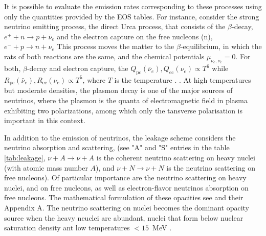 %
%
It is possible to evaluate the emission rates corresponding to these processes 
using only the quantities provided by the \ac{EOS} tables.
%
For instance, consider the strong neutrino emitting process, the direct Urca process, that consists of the $\beta$-decay, $e^+ + n \rightarrow p + \bar{\nu}_e$ and the electron capture on the free nucleons (n), $e^{-} + p \rightarrow n + \nu_e$ 
This process moves the matter to the $\beta$-equilibrium, in which the rats of both reactions are the same, 
and the chemical potentials $\mu_{\nu_e,\bar{\nu}_e}=0$.
%
For both, $\beta$-decay and electron capture, the 
$Q_{\text{pc}}(\bar{\nu}_e),Q_{\text{ec}}({\nu_e}) \propto T^{6}$ 
while 
$R_{\text{pc}}(\bar{\nu}_e),R_{\text{ec}}(\nu_e)\propto T^5$, 
where $T$ is the temperature \citep{Bruenn:1985}.
%
.
%
At high temperatures but moderate densities, the plasmon decay is one of the major sources of neutrinos, 
where the plasmon is the quanta of electromagnetic field in plasma exhibiting two polarizations, 
among which only the tansverse polarisation is important in this context.

In addition to the emission of neutrinos, the leakage scheme considers the neutrino absorption and scattering, 
(see "A" and "S" entries in the table \ref{tab:leakage}, $\nu+A\rightarrow\nu+A$ is the coherent neutrino 
scattering on heavy nuclei (with atomic mass number $A$), and $\nu+N\rightarrow\nu+N$ 
is the neutrino scattering on free nucleons).
%
Of particular importance are the neutrino scattering on heavy nuclei, and on free nucleons, 
as well as electron-flavor neutrinos absorption on free nucleons. 
The mathematical formulation of these opacities see \citet{Galeazzi:2013mia} and their Appendix A.
%
The neutrino scattering on nuclei becomes the dominant opacity source when the heavy neuclei 
are abundant, nuclei that form below nuclear saturation density ant low temperatures $<15$~MeV \citep{Rosswog:2003rv}.

